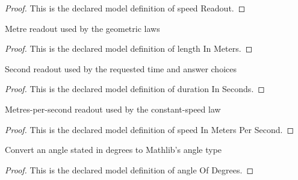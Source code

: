 \begin{proof}
  This is the declared model definition of speed Readout.
\end{proof}
\begin{definition}
  \label{def:physics:phyx-mini-0731:phyxminiproblems-problemphyxmini0731-lengthinmeters}
  Metre readout used by the geometric laws
\end{definition}
\begin{proof}
  This is the declared model definition of length In Meters.
\end{proof}
\begin{definition}
  \label{def:physics:phyx-mini-0731:phyxminiproblems-problemphyxmini0731-durationinseconds}
  Second readout used by the requested time and answer choices
\end{definition}
\begin{proof}
  This is the declared model definition of duration In Seconds.
\end{proof}
\begin{definition}
  \label{def:physics:phyx-mini-0731:phyxminiproblems-problemphyxmini0731-speedinmeterspersecond}
  Metres-per-second readout used by the constant-speed law
\end{definition}
\begin{proof}
  This is the declared model definition of speed In Meters Per Second.
\end{proof}
\begin{definition}
  \label{def:physics:phyx-mini-0731:phyxminiproblems-problemphyxmini0731-angleofdegrees}
  Convert an angle stated in degrees to Mathlib's angle type
\end{definition}
\begin{proof}
  This is the declared model definition of angle Of Degrees.
\end{proof}
